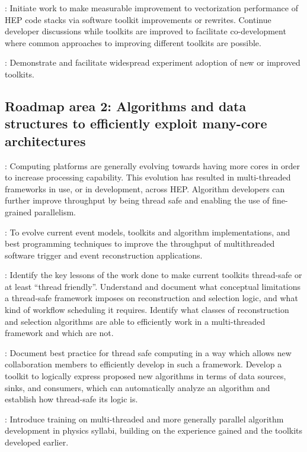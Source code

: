 \vskip 0.5cm
: Initiate work to make measurable improvement to vectorization performance of HEP code stacks via software toolkit improvements or rewrites. Continue developer discussions while toolkits are improved to facilitate co-development where common approaches to improving different toolkits are possible. 

\vskip 0.5cm
: Demonstrate and facilitate widespread experiment adoption of new or improved toolkits.

\subsection{Roadmap area 2: Algorithms and data structures to efficiently exploit many-core architectures}
: Computing platforms are generally evolving towards having more cores in order to increase processing capability. This evolution has resulted in multi-threaded frameworks in use, or in development, across HEP. Algorithm developers can further improve throughput by being thread safe and enabling the use of fine-grained parallelism. 

\vskip 0.5cm
: To evolve current event models, toolkits and algorithm implementations, and best programming techniques to improve the throughput of multithreaded software trigger and event reconstruction applications.

\vskip 0.5cm
: Identify the key lessons of the work done to make current toolkits thread-safe or at least “thread friendly”. Understand and document what conceptual limitations a thread-safe framework imposes on reconstruction and selection logic, and what kind of workflow scheduling it requires. Identify what classes of reconstruction and selection algorithms are able to efficiently work in a multi-threaded framework and which are not. 

\vskip 0.5cm
: Document best practice for thread safe computing in a way which allows new collaboration members to efficiently develop in such a framework. Develop a toolkit to logically express proposed new algorithms in terms of data sources, sinks, and consumers, which can automatically analyze an algorithm and establish how thread-safe its logic is.

\vskip 0.5cm
: Introduce training on multi-threaded and more generally parallel algorithm development in physics syllabi, building on the experience gained and the toolkits developed earlier.

